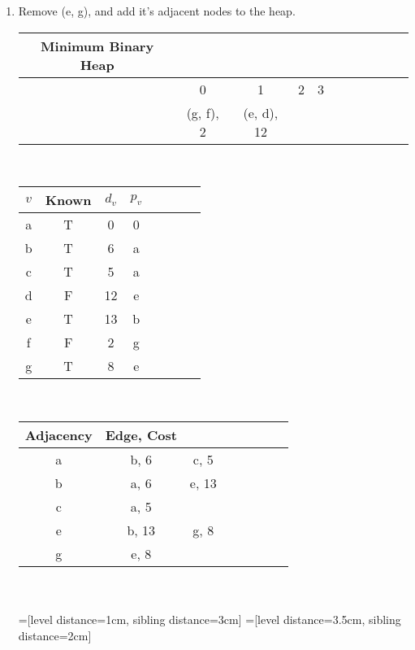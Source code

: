 \documentclass[11pt]{article}
\begin{document}
\begin{enumerate}
\begin{enumerate}
\item Remove (e, g), and add it's adjacent nodes to the heap.\\
\begin{tabular}{ccccccccccc}
Minimum Binary Heap\\\hline
&0&1&2&3\\
&(g, f), 2&(e, d), 12& \\
\end{tabular}\\
\begin{tabular}{c|ccccccc|}
$v$& Known& $d_v$ & $p_v$\\\hline
a&T & 0 & 0\\
b&T & 6 & a\\
c&T & 5 & a\\
d&F & 12 & e\\
e&T & 13 & b\\
f&F & 2 & g\\
g&T & 8 & e
\end{tabular}\\
\begin{tabular}{c|ccccccc|}
Adjacency& Edge, Cost\\\hline
a& b, 6 & c, 5\\
b&a, 6&e, 13\\
c&a, 5&\\
e&b, 13& g, 8\\
g& e, 8\\
\end{tabular}\\
\\
=[level distance=1cm, sibling distance=3cm]
=[level distance=3.5cm, sibling distance=2cm]


\end{enumerate}
\end{enumerate}
\end{document}
